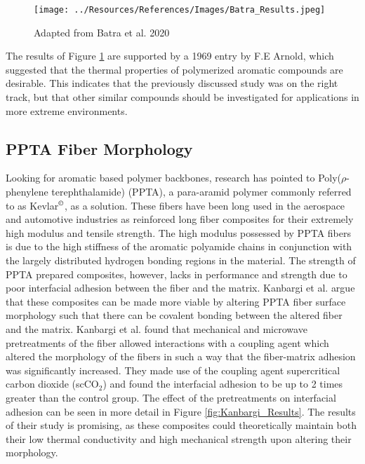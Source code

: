 \documentclass[12pt]{article}
\begin{document}
\begin{multicols}{2}
\begin{figure}[H]
    \centering
    \texttt{[image: ../Resources/References/Images/Batra\_Results.jpeg]}
    \caption{\scriptsize{Adapted from Batra et al. 2020 \citep{Batra2020}}}
    \label{fig:Batra_Results}
\end{figure}

\indent The results of Figure \ref{fig:Batra_Results} are supported by a 1969 entry by F.E Arnold, which suggested that the thermal properties of polymerized aromatic compounds are desirable. \citep{Arnold1969} This indicates that the previously discussed study was on the right track, but that other similar compounds should be investigated for applications in more extreme environments.

\subsection{PPTA Fiber Morphology}

\vspace{-0.4em}

\indent Looking for aromatic based polymer backbones, research has pointed to Poly($\rho$-phenylene terephthalamide) (PPTA), a para-aramid polymer commonly referred to as Kevlar$^{\text{\textcopyright}}$, as a solution. \citep{Liu2019} These fibers have been long used in the aerospace and automotive industries as reinforced long fiber composites for their extremely high modulus and tensile strength. \cite{Cheng2005} The high modulus possessed by PPTA fibers is due to the high stiffness of the aromatic polyamide chains in conjunction with the largely distributed hydrogen bonding regions in the material. \citep{Wang2020} The strength of PPTA prepared composites, however, lacks in performance and strength due to poor interfacial adhesion between the fiber and the matrix. \citep{Kanbargi2017} Kanbargi et al. \citep{Kanbargi2017} argue that these composites can be made more viable by altering PPTA fiber surface morphology such that there can be covalent bonding between the altered fiber and the matrix. Kanbargi et al. \citep{Kanbargi2017} found that mechanical and microwave pretreatments of the fiber allowed interactions with a coupling agent which altered the morphology of the fibers in such a way that the fiber-matrix adhesion was significantly increased. They made use of the coupling agent supercritical carbon dioxide (scCO$_2$) and found the interfacial adhesion to be up to 2 times greater than the control group. \citep{Kanbargi2017} The effect of the pretreatments on interfacial adhesion can be seen in more detail in Figure \ref{fig:Kanbargi_Results}. The results of their study is promising, as these composites could theoretically maintain both their low thermal conductivity and high mechanical strength upon altering their morphology.


\end{multicols}
\end{document}
